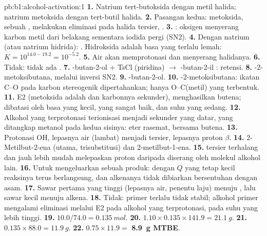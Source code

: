 \begin{solution}{pb:b1:alcohol-activation:1}
\textbf{1.} Natrium tert-butoksida dengan metil halida; natrium metoksida
dengan tert-butil halida.
\textbf{2.} Pasangan kedua: metoksida, sebuah , melakukan
eliminasi pada halida tersier,
.
\textbf{3.} : oksigen 
menyerang karbon metil dari belakang sementara iodida pergi (SN2).
\textbf{4.} Dengan natrium (atau natrium hidrida): . Hidroksida adalah basa yang terlalu lemah: $K = 10^{14.0 -
19.2} = 10^{-5.2}$.
\textbf{5.} Air akan memprotonasi  dan menyerang halidanya.
\textbf{6.} Tidak: tidak ada .
\textbf{7.} -butan-2-ol + TsCl (piridina) $\to$ -butan-2-il
: retensi.
\textbf{8.} -2-metoksibutana, melalui inversi SN2.
\textbf{9.} -butan-2-ol.
\textbf{10.} -2-metoksibutana: ikatan C--O pada karbon stereogenik
dipertahankan; hanya O--C(metil) yang terbentuk.
\textbf{11.} E2 (metoksida adalah  dan karbonnya sekunder),
menghasilkan butena; dibatasi oleh basa yang kecil,  yang
sangat baik, dan suhu yang sedang.
\textbf{12.} Alkohol yang terprotonasi terionisasi menjadi 
sekunder yang datar, yang ditangkap metanol pada kedua sisinya: eter
rasemat, bersama butena.
\textbf{13.} Protonasi OH, lepasnya air (lambat) menjadi 
tersier, lepasnya proton $\beta$.
\textbf{14.} 2-Metilbut-2-ena (utama, trisubstitusi) dan
2-metilbut-1-ena.
\textbf{15.}  tersier terhalang dan jauh lebih mudah
melepaskan proton daripada diserang oleh molekul alkohol lain.
\textbf{16.} Untuk mengeluarkan sebuah produk: dengan $Q$ yang tetap kecil
reaksinya terus berlangsung, dan alkenanya tidak dibiarkan bersentuhan
dengan asam.
\textbf{17.} Sawar pertama yang tinggi (lepasnya air, penentu laju) menuju
, lalu sawar kecil menuju alkena.
\textbf{18.} Tidak:  primer terlalu tidak stabil; alkohol primer
mengalami eliminasi melalui E2 pada alkohol yang terprotonasi, pada suhu
yang lebih tinggi.
\textbf{19.} $10.0/74.0 = \qty{0.135}{mol}$.
\textbf{20.} $1.10 \times 0.135 \times 141.9 = \qty{21.1}{g}$.
\textbf{21.} $0.135 \times 88.0 = \qty{11.9}{g}$.
\textbf{22.} $0.75 \times 11.9 =$ \textbf{\qty{8.9}{g} MTBE}.
\end{solution}
